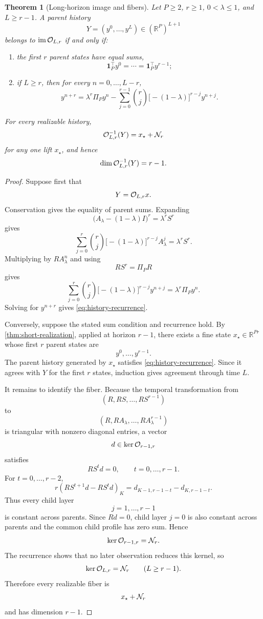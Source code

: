 \documentclass[11pt]{article}
\newtheorem{theorem}{Theorem}
\newcommand{\R}{\mathbb R}
\DeclareMathOperator{\im}{im}
\begin{document}
\begin{theorem}[Long-horizon image and fibers]
\label{thm:long-realization}
Let \(P\ge2\), \(r\ge1\), \(0<\lambda\le1\), and \(L\ge r-1\).  A parent
history
\[
  Y=(y^0,\ldots,y^L)\in(\R^P)^{L+1}
\]
belongs to \(\im{\cal O}_{L,r}\) if and only if:
\begin{enumerate}
\item the first \(r\) parent states have equal sums,
\[
  \mathbf 1_P^\top y^0
  =
  \cdots
  =
  \mathbf 1_P^\top y^{r-1};
\]
\item if \(L\ge r\), then for every \(n=0,\ldots,L-r\),
\begin{equation}
  y^{n+r}
  =
  \lambda^r\Pi_P y^n
  -
  \sum_{j=0}^{r-1}
  \binom{r}{j}
  \bigl[-(1-\lambda)\bigr]^{r-j}
  y^{n+j}.
  \label{eq:history-recurrence}
\end{equation}
\end{enumerate}
For every realizable history,
\[
  {\cal O}_{L,r}^{-1}(Y)
  =
  x_\star+{\cal N}_r
\]
for any one lift \(x_\star\), and hence
\[
  \dim{\cal O}_{L,r}^{-1}(Y)=r-1.
\]
\end{theorem}

\begin{proof}
Suppose first that
\[
  Y={\cal O}_{L,r}x.
\]
Conservation gives the equality of parent sums.  Expanding
\[
  \bigl(A_\lambda-(1-\lambda)I\bigr)^r=\lambda^rS^r
\]
gives
\[
  \sum_{j=0}^{r}
  \binom{r}{j}
  \bigl[-(1-\lambda)\bigr]^{r-j}
  A_\lambda^j
  =
  \lambda^rS^r.
\]
Multiplying by \(RA_\lambda^n\) and using
\[
  RS^r=\Pi_PR
\]
gives
\[
  \sum_{j=0}^{r}
  \binom{r}{j}
  \bigl[-(1-\lambda)\bigr]^{r-j}
  y^{n+j}
  =
  \lambda^r\Pi_Py^n.
\]
Solving for \(y^{n+r}\) gives \eqref{eq:history-recurrence}.

Conversely, suppose the stated sum condition and recurrence hold.  By
\cref{thm:short-realization}, applied at horizon \(r-1\), there exists a
fine state \(x_\star\in\R^{Pr}\) whose first \(r\) parent states are
\[
  y^0,\ldots,y^{r-1}.
\]
The parent history generated by \(x_\star\) satisfies
\eqref{eq:history-recurrence}.  Since it agrees with \(Y\) for the first
\(r\) states, induction gives agreement through time \(L\).

It remains to identify the fiber.  Because the temporal transformation from
\[
  (R,RS,\ldots,RS^{r-1})
\]
to
\[
  (R,RA_\lambda,\ldots,RA_\lambda^{r-1})
\]
is triangular with nonzero diagonal entries, a vector
\[
  d\in\ker{\cal O}_{r-1,r}
\]
satisfies
\[
  RS^td=0,
  \qquad t=0,\ldots,r-1.
\]
For \(t=0,\ldots,r-2\),
\[
  r(RS^{t+1}d-RS^td)_K
  =
  d_{K-1,r-1-t}-d_{K,r-1-t}.
\]
Thus every child layer
\[
  j=1,\ldots,r-1
\]
is constant across parents.  Since \(Rd=0\), child layer \(j=0\) is also
constant across parents and the common child profile has zero sum.  Hence
\[
  \ker{\cal O}_{r-1,r}={\cal N}_r.
\]
The recurrence shows that no later observation reduces this kernel, so
\[
  \ker{\cal O}_{L,r}={\cal N}_r
  \qquad
  (L\ge r-1).
\]
Therefore every realizable fiber is
\[
  x_\star+{\cal N}_r
\]
and has dimension \(r-1\).
\end{proof}
\end{document}
